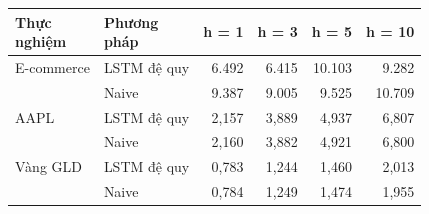 \begin{tabular}{llrrrr}
\toprule
\makecell[l]{Thực\\nghiệm} & \makecell[l]{Phương\\pháp} & h = 1 & h = 3 & h = 5 & h = 10 \\
\midrule
E-commerce & LSTM đệ quy & 6{.}492 & 6{.}415 & 10{.}103 & 9{.}282 \\
 & Naive & 9{.}387 & 9{.}005 & 9{.}525 & 10{.}709 \\
AAPL & LSTM đệ quy & 2{,}157 & 3{,}889 & 4{,}937 & 6{,}807 \\
 & Naive & 2{,}160 & 3{,}882 & 4{,}921 & 6{,}800 \\
Vàng GLD & LSTM đệ quy & 0{,}783 & 1{,}244 & 1{,}460 & 2{,}013 \\
 & Naive & 0{,}784 & 1{,}249 & 1{,}474 & 1{,}955 \\
\bottomrule
\end{tabular}
